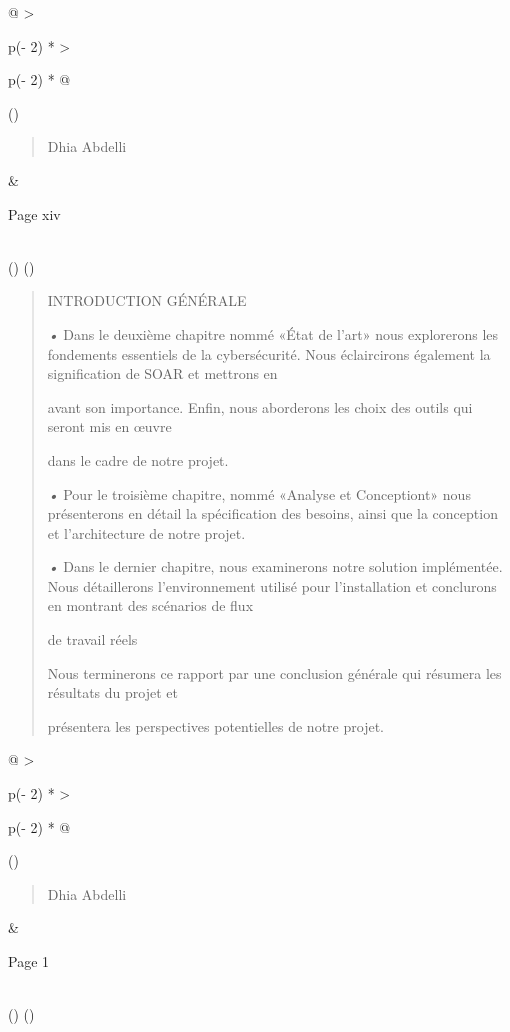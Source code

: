 \documentclass[
]{article}
\begin{document}
\begin{longtable}[]{@{}
  >{\raggedright\arraybackslash}p{(\columnwidth - 2\tabcolsep) * }
  >{\raggedright\arraybackslash}p{(\columnwidth - 2\tabcolsep) * }@{}}
\toprule()
\begin{minipage}[b]{\linewidth}\raggedright
\begin{quote}
Dhia Abdelli
\end{quote}
\end{minipage} & \begin{minipage}[b]{\linewidth}\raggedright
Page xiv
\end{minipage} \\
\midrule()
\endhead
\bottomrule()
\end{longtable}

\begin{quote}
INTRODUCTION GÉNÉRALE

\emph{•} Dans le deuxième chapitre nommé «État de l'art» nous
explorerons les fondements essentiels de la cybersécurité. Nous
éclaircirons également la signification de SOAR et mettrons en

avant son importance. Enfin, nous aborderons les choix des outils qui
seront mis en œuvre

dans le cadre de notre projet.

\emph{•} Pour le troisième chapitre, nommé «Analyse et Conceptiont» nous
présenterons en détail la spécification des besoins, ainsi que la
conception et l'architecture de notre projet.

\emph{•} Dans le dernier chapitre, nous examinerons notre solution
implémentée. Nous détaillerons l'environnement utilisé pour
l'installation et conclurons en montrant des scénarios de flux

de travail réels

Nous terminerons ce rapport par une conclusion générale qui résumera les
résultats du projet et

présentera les perspectives potentielles de notre projet.
\end{quote}

\begin{longtable}[]{@{}
  >{\raggedright\arraybackslash}p{(\columnwidth - 2\tabcolsep) * }
  >{\raggedright\arraybackslash}p{(\columnwidth - 2\tabcolsep) * }@{}}
\toprule()
\begin{minipage}[b]{\linewidth}\raggedright
\begin{quote}
Dhia Abdelli
\end{quote}
\end{minipage} & \begin{minipage}[b]{\linewidth}\raggedright
Page 1
\end{minipage} \\
\midrule()
\endhead
\bottomrule()
\end{longtable}
\end{document}
